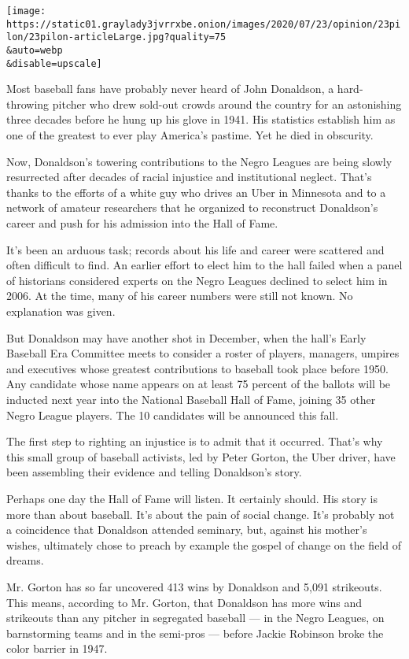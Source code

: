 \texttt{[image: https://static01.graylady3jvrrxbe.onion/images/2020/07/23/opinion/23pilon/23pilon-articleLarge.jpg?quality=75\\\&auto=webp\\\&disable=upscale]}

Most baseball fans have probably never heard of John Donaldson, a
hard-throwing pitcher who drew sold-out crowds around the country for an
astonishing three decades before he hung up his glove in 1941. His
statistics establish him as one of the greatest to ever play America's
pastime. Yet he died in obscurity.

Now, Donaldson's towering contributions to the Negro Leagues are being
slowly resurrected after decades of racial injustice and institutional
neglect. That's thanks to the efforts of a white guy who drives an Uber
in Minnesota and to a network of amateur researchers that he organized
to reconstruct Donaldson's career and push for his admission into the
Hall of Fame.

It's been an arduous task; records about his life and career were
scattered and often difficult to find. An earlier effort to elect him to
the hall failed when a panel of historians considered experts on the
Negro Leagues declined to select him in 2006. At the time, many of his
career numbers were still not known. No explanation was given.

But Donaldson may have another shot in December, when the hall's Early
Baseball Era Committee meets to consider a roster of players, managers,
umpires and executives whose greatest contributions to baseball took
place before 1950. Any candidate whose name appears on at least 75
percent of the ballots will be inducted next year into the National
Baseball Hall of Fame, joining 35 other Negro League players. The 10
candidates will be announced this fall.

The first step to righting an injustice is to admit that it occurred.
That's why this small group of baseball activists, led by Peter Gorton,
the Uber driver, have been assembling their evidence and telling
Donaldson's story.

Perhaps one day the Hall of Fame will listen. It certainly should. His
story is more than about baseball. It's about the pain of social change.
It's probably not a coincidence that Donaldson attended seminary, but,
against his mother's wishes, ultimately chose to preach by example the
gospel of change on the field of dreams.

Mr. Gorton has so far uncovered 413 wins by Donaldson and 5,091
strikeouts. This means, according to Mr. Gorton, that Donaldson has more
wins and strikeouts than any pitcher in segregated baseball --- in the
Negro Leagues, on barnstorming teams and in the semi-pros --- before
Jackie Robinson broke the color barrier in 1947.

